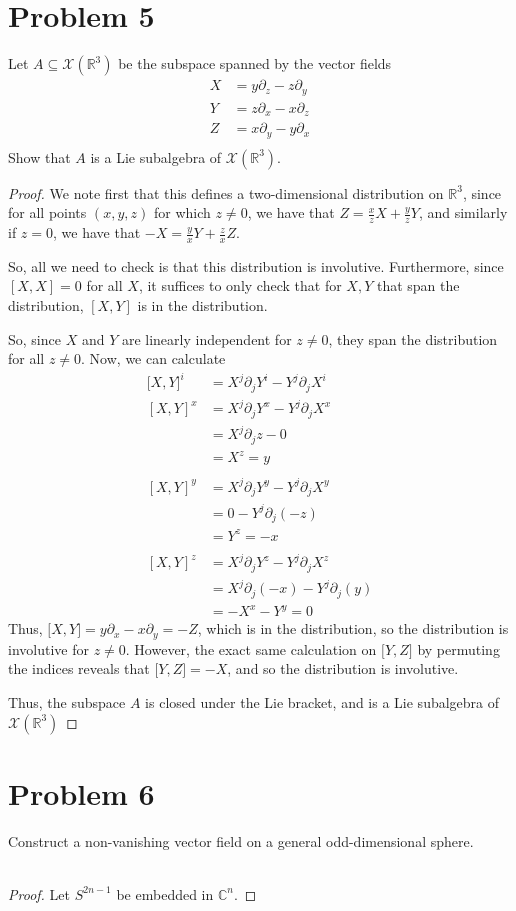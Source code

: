 \documentclass[fontsize=11pt]{scrartcl} %
\numberwithin{equation}{section} %
\numberwithin{figure}{section} %
\numberwithin{table}{section} %
\newcommand{\R}{\mathbb{R}}
\newcommand{\C}{\mathbb{C}}
\begin{document}
\section*{Problem 5} %
Let $A\subseteq \mathcal{X}(\R^3)$ be the subspace spanned by the vector fields
\[
    \begin{aligned}
        X &= y\partial_z - z\partial_y\\
        Y &= z\partial_x - x\partial_z\\
        Z &= x\partial_y - y\partial_x\\
    \end{aligned}
\]
Show that $A$ is a Lie subalgebra of $\mathcal{X}(\R^3)$.
\\
\begin{proof}
    We note first that this defines a two-dimensional distribution on $\R^3$,
    since for all points $(x,y,z)$ for which $z\neq 0$, we have that
    $Z = \frac{x}{z}X + \frac{y}{z}Y$, and similarly if $z=0$, we have that
    $-X = \frac{y}{x}Y + \frac{z}{x}Z$. 

    So, all we need to check is that this distribution is involutive.
    Furthermore, since $[X,X]=0$ for all $X$, it suffices to only check that for
    $X,Y$ that span the distribution, $[X,Y]$ is in the distribution.

    So, since $X$ and $Y$ are linearly independent for $z\neq 0$, they span the
    distribution for all $z\neq 0$. Now, we can calculate
    \[
        \begin{aligned}
            {[}X,Y{]}^i &= X^j\partial_jY^i - Y^j\partial_jX^i\\
            [X,Y]^x &= X^j\partial_jY^x - Y^j\partial_jX^x\\
                    &= X^j\partial_jz - 0\\
                    &= X^z = y\\
                    \\
            [X,Y]^y &= X^j\partial_jY^y - Y^j\partial_jX^y\\
                    &= 0 - Y^j\partial_j(-z)\\
                    &= Y^z = -x\\
                    \\
            [X,Y]^z &= X^j\partial_jY^z - Y^j\partial_jX^z\\
                    &= X^j\partial_j(-x) - Y^j\partial_j(y)\\
                    &=-X^x - Y^y = 0
        \end{aligned}
    \]
    Thus, ${[}X,Y{]} = y\partial_x - x\partial_y = -Z$, which is in the
    distribution, so the distribution is involutive for $z\neq 0$. However, the
    exact same calculation on ${[}Y,Z{]}$ by permuting the indices reveals that
    ${[}Y,Z{]} = -X$, and so the distribution is involutive.

    Thus, the subspace $A$ is closed under the Lie bracket, and is a Lie
    subalgebra of $\mathcal{X}(\R^3)$
\end{proof}

\section*{Problem 6}
Construct a non-vanishing vector field on a general odd-dimensional sphere.
\\
\\
\begin{proof}
    Let $S^{2n-1}$ be embedded in $\C^n$.
\end{proof}
\end{document}
